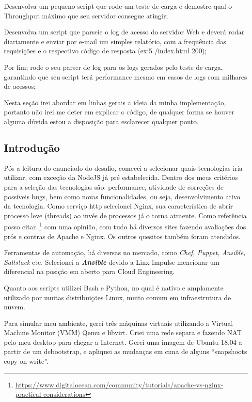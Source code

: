 Desenvolva um pequeno script que rode um teste de carga e demostre
qual o Throughput máximo que seu servidor consegue atingir; 

Desenvolva um script que parseie o log de acesso do servidor Web e
deverá rodar diariamente e enviar por e-mail um simples relatório, com
a frequência das requisições e o respectivo código de resposta (ex:5
/index.html 200); 

Por fim; rode o seu parser de log para os logs gerados pelo teste de
carga, garantindo que seu script terá performance mesmo em casos de
logs com milhares de acessos;

Nesta seção irei abordar em linhas gerais a ideia da minha
implementação, portanto não irei me deter em explicar o código, de
qualquer forma se houver alguma dúvida estou a disposição para
esclarecer qualquer ponto.


\subsection{Introdução}
Pós a leitura do enunciado do desafio, comecei a selecionar quais
tecnologias iria utilizar, com exceção da NodeJS já pré
estabelecida. Dentro dos meus critérios para a seleção das tecnologias
são: performance, atividade de correções de possíveis bugs, bem como
novas funcionalidades, ou seja, desenvolvimento ativo da tecnologia.
Como serviço http selecionei Nginx, sua característica de abrir
processo leve (threads) ao invés de processos já o torna
atraente. Como referência posso
citar~\footnote{\href{https://www.digitalocean.com/community/tutorials/apache-vs-nginx-practical-considerations}{https://www.digitalocean.com/community/tutorials/apache-vs-nginx-practical-considerations}}
com uma opinião, com tudo há diversos sites fazendo avaliações dos
prós e contras de Apache e Nginx. Os outros quesitos também foram
atendidos.

Ferramentas de automação, há diversas no mercado, como \emph{Chef, Puppet,
Ansible, Saltstack} etc. Selecionei a \emph{\textbf{Ansible}} devido a Linx Impulse
mencionar um diferencial na posição em aberto para Cloud Engineering.

Quanto aos scripts utilizei Bash e Python, no qual é nativo e
amplamente utilizado por muitas distribuições Linux, muito comum em
infraestrutura de nuvem.

Para simular meu ambiente, gerei três máquinas virtuais utilizando a
Virtual Machine Monitor (VMM) Qemu e libvirt. Criei uma rede separa e
fazendo NAT pelo meu desktop para chegar a Internet. Gerei uma imagem
de Ubuntu 18.04 a partir de um debootstrap, e apliquei as mudanças em
cima de alguns ``snapshoots copy on write''.

